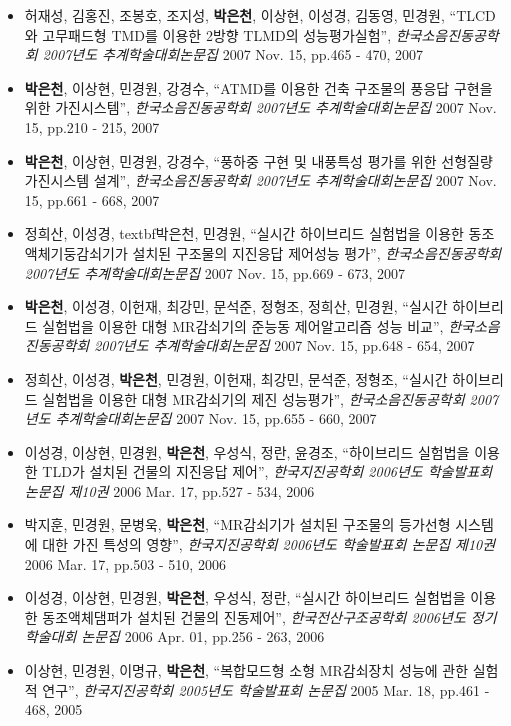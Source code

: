\begin{itemize}
\item
  허재성, 김홍진, 조봉호, 조지성, \textbf{박은천}, 이상현, 이성경,
  김동영, 민경원, ``TLCD와 고무패드형 TMD를 이용한 2방향 TLMD의
  성능평가실험'', \emph{한국소음진동공학회 2007년도 추계학술대회논문집}
  2007 Nov. 15, pp.465 - 470, 2007
\item
  \textbf{박은천}, 이상현, 민경원, 강경수, ``ATMD를 이용한 건축 구조물의
  풍응답 구현을 위한 가진시스템'', \emph{한국소음진동공학회 2007년도
  추계학술대회논문집} 2007 Nov. 15, pp.210 - 215, 2007
\item
  \textbf{박은천}, 이상현, 민경원, 강경수, ``풍하중 구현 및 내풍특성
  평가를 위한 선형질량 가진시스템 설계'', \emph{한국소음진동공학회
  2007년도 추계학술대회논문집} 2007 Nov. 15, pp.661 - 668, 2007
\item
  정희산, 이성경, textbf{박은천}, 민경원, ``실시간 하이브리드 실험법을
  이용한 동조액체기둥감쇠기가 설치된 구조물의 지진응답 제어성능 평가'',
  \emph{한국소음진동공학회 2007년도 추계학술대회논문집} 2007 Nov. 15,
  pp.669 - 673, 2007
\item
  \textbf{박은천}, 이성경, 이헌재, 최강민, 문석준, 정형조, 정희산,
  민경원, ``실시간 하이브리드 실험법을 이용한 대형 MR감쇠기의 준능동
  제어알고리즘 성능 비교'', \emph{한국소음진동공학회 2007년도
  추계학술대회논문집} 2007 Nov. 15, pp.648 - 654, 2007
\item
  정희산, 이성경, \textbf{박은천}, 민경원, 이헌재, 최강민, 문석준,
  정형조, ``실시간 하이브리드 실험법을 이용한 대형 MR감쇠기의 제진
  성능평가'', \emph{한국소음진동공학회 2007년도 추계학술대회논문집} 2007
  Nov. 15, pp.655 - 660, 2007
\item
  이성경, 이상현, 민경원, \textbf{박은천}, 우성식, 정란, 윤경조,
  ``하이브리드 실험법을 이용한 TLD가 설치된 건물의 지진응답 제어'',
  \emph{한국지진공학회 2006년도 학술발표회 논문집 제10권} 2006 Mar. 17,
  pp.527 - 534, 2006
\item
  박지훈, 민경원, 문병욱, \textbf{박은천}, ``MR감쇠기가 설치된 구조물의
  등가선형 시스템에 대한 가진 특성의 영향'', \emph{한국지진공학회
  2006년도 학술발표회 논문집 제10권} 2006 Mar. 17, pp.503 - 510, 2006
\item
  이성경, 이상현, 민경원, \textbf{박은천}, 우성식, 정란, ``실시간
  하이브리드 실험법을 이용한 동조액체댐퍼가 설치된 건물의 진동제어'',
  \emph{한국전산구조공학회 2006년도 정기 학술대회 논문집} 2006 Apr. 01,
  pp.256 - 263, 2006
\item
  이상현, 민경원, 이명규, \textbf{박은천}, ``복합모드형 소형 MR감쇠장치
  성능에 관한 실험적 연구'', \emph{한국지진공학회 2005년도 학술발표회
  논문집} 2005 Mar. 18, pp.461 - 468, 2005
\end{itemize}

